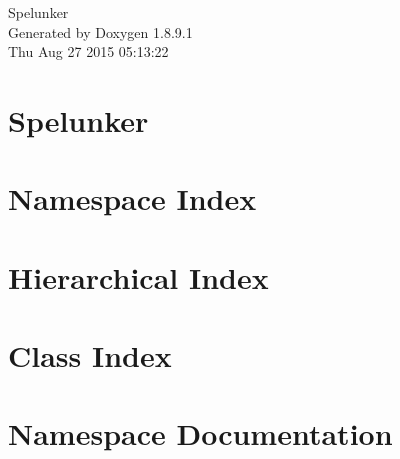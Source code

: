 \documentclass[twoside]{book}
\newcommand{\+}{\discretionary{\mbox{\scriptsize$\hookleftarrow$}}{}{}}
\newcommand{\clearemptydoublepage}{%
  \newpage{\pagestyle{empty}\cleardoublepage}%
}
\begin{document}
\hypersetup{pageanchor=false,
             bookmarks=true,
             bookmarksnumbered=true,
             pdfencoding=unicode
            }
\begin{titlepage}
\vspace*{7cm}
\begin{center}%
{\Large Spelunker }\\
\vspace*{1cm}
{\large Generated by Doxygen 1.8.9.1}\\
\vspace*{0.5cm}
{\small Thu Aug 27 2015 05:13:22}\\
\end{center}
\end{titlepage}
\clearemptydoublepage
\tableofcontents
\clearemptydoublepage
{}
\hypersetup{pageanchor=true}

\chapter{Spelunker}
\label{index}\hypertarget{index}{}
\chapter{Namespace Index}

\chapter{Hierarchical Index}

\chapter{Class Index}

\chapter{Namespace Documentation}
















\end{document}
